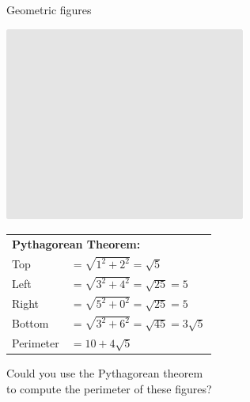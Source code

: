 \documentclass[14pt]{beamer}
\begin{document}
    \begin{frame}{Geometric figures}
        \begin{center}        
            \begin{minipage}{0.5\textwidth}%
                \centering \includegraphics[scale=0.70]{figures/figure022b.pdf}
            \end{minipage}\hfill\begin{minipage}{0.49\textwidth} \footnotesize

                \hspace{-0.5em}\begin{tabular}{ll}                
                    \multicolumn{2}{l}{\small \textbf{Pythagorean Theorem:}}           \\[4ex]                
                    Top       & $\!\!\!\!\!= \sqrt{1^2 + 2^2} = \sqrt{5}$              \\[1.5ex]
                    Left      & $\!\!\!\!\!= \sqrt{3^2 + 4^2} = \sqrt{25} = 5$         \\[1.5ex]
                    Right     & $\!\!\!\!\!= \sqrt{5^2 + 0^2} = \sqrt{25} = 5$         \\[1.5ex]
                    Bottom    & $\!\!\!\!\!= \sqrt{3^2 + 6^2} = \sqrt{45} = 3\sqrt{5}$ \\[4ex]
                    Perimeter & $\!\!\!\!\!= 10 + 4\sqrt{5}$                 
                \end{tabular}
            \end{minipage}

            \bigskip \bigskip

            Could you use the Pythagorean theorem\\to compute the perimeter of these figures?
        \end{center}
        
    \end{frame}
\end{document}
